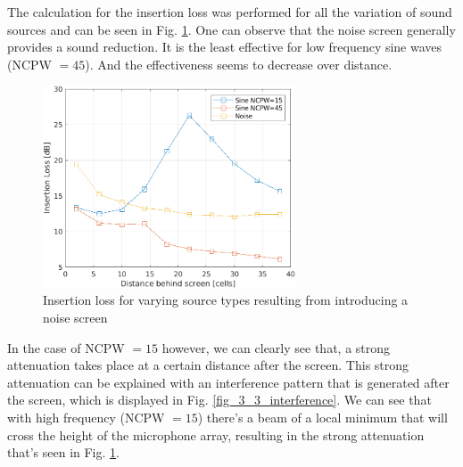 \documentclass[twocolumn]{article}
\begin{document}
The calculation for the insertion loss was performed for all the variation of
sound sources and can be seen in Fig. \ref{fig_3_3_loss}.
One can observe that the noise screen generally provides a sound reduction.
It is the least effective for low frequency sine waves (NCPW $= 45$).
And the effectiveness seems to decrease over distance.

\begin{figure}[H]
    \centering
    \includegraphics[width=75mm]{./Images/3_3_insertion_loss.png}
    \caption{Insertion loss for varying source types resulting from introducing a noise screen}
    \label{fig_3_3_loss}
\end{figure}

In the case of NCPW $= 15$ however, we can clearly see that, a strong attenuation takes
place at a certain distance after the screen.
This strong attenuation can be explained with an interference pattern that is
generated after the screen, which is displayed in Fig. \ref{fig_3_3_interference}.
We can see that with high frequency (NCPW $=15$) there's a beam of a local minimum that will
cross the height of the microphone array, resulting in the strong attenuation
that's seen in Fig. \ref{fig_3_3_loss}.
\end{document}
